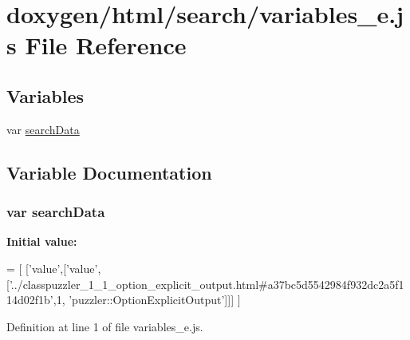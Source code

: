 \hypertarget{a00118}{}\section{doxygen/html/search/variables\+\_\+e.js File Reference}
\label{a00118}
\subsection*{Variables}
\begin{DoxyCompactItemize}
\item 
var \hyperlink{a00118_ad01a7523f103d6242ef9b0451861231e}{search\+Data}
\end{DoxyCompactItemize}


\subsection{Variable Documentation}
\hypertarget{a00118_ad01a7523f103d6242ef9b0451861231e}{}
\subsubsection[{search\+Data}]{\setlength{\rightskip}{0pt plus 5cm}var search\+Data}\label{a00118_ad01a7523f103d6242ef9b0451861231e}
{\bfseries Initial value\+:}
\begin{DoxyCode}
=
[
  [\textcolor{stringliteral}{'value'},[\textcolor{stringliteral}{'value'},[\textcolor{stringliteral}{'../classpuzzler\_1\_1\_option\_explicit\_output.html#a37bc5d5542984f932dc2a5f114d02f1b'},1,\textcolor{stringliteral}{
      'puzzler::OptionExplicitOutput'}]]]
]
\end{DoxyCode}


Definition at line 1 of file variables\+\_\+e.\+js.

